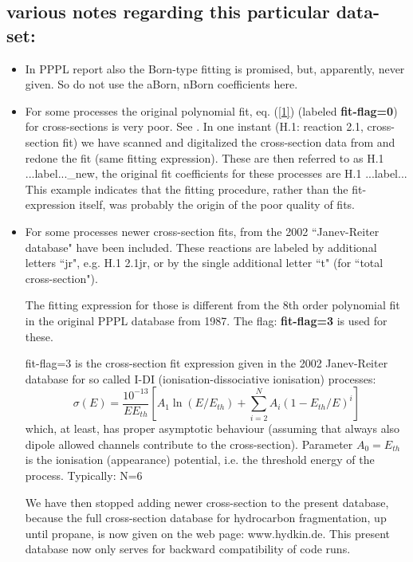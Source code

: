 \documentclass[12pt,dvipdfmx]{article}
\begin{document}
\subsection{various notes regarding this particular data-set:}
\begin{itemize}
\item
In PPPL report \cite{kn:Ehrhardt} also the Born-type fitting is
promised, but, apparently, never given. So do not use the  aBorn,
nBorn coefficients here.
\item
For some processes the original polynomial fit, eq. (\ref{1})
(labeled \textbf{fit-flag=0}) for cross-sections is very poor. See
\cite{kn:Dose}.
In one instant (H.1: reaction 2.1, cross-section fit) we have scanned and
digitalized the cross-section data from
\cite{kn:Ehrhardt} and redone the fit (same fitting expression).
These are then referred to as H.1 ...label...\mbox{\_new}, the original fit
coefficients for these processes are H.1 ...label...
This example indicates that the fitting procedure,
rather than the fit-expression itself, was probably the origin of the poor quality of fits.
\item
For some processes newer cross-section fits, from the 2002 ``Janev-Reiter database"
\cite{kn:JR-2002} have been included.
These reactions are labeled by additional letters ``jr",  e.g. H.1  2.1jr,
or by the single additional letter ``t" (for ``total cross-section").

The fitting expression for those is different from the 8th order polynomial fit
in the original PPPL database from 1987.
The flag: \textbf{fit-flag=3} is used for these.


fit-flag=3 is the cross-section fit expression given in the 2002 Janev-Reiter database \cite{kn:JR-2002} for so called I-DI (ionisation-dissociative ionisation) processes:
\begin{equation}\label{4}
\sigma(E)=\frac{10^{-13}}{E E_{th}}\left[A_1 \ln(E/E_{th}) + \sum_{i=2}^N A_i(1-E_{th}/E)^i \right]
\end{equation}
which, at least, has proper asymptotic behaviour (assuming that always also dipole allowed channels contribute to the cross-section).
Parameter $A_0 = E_{th}$ is the ionisation (appearance) potential, i.e. the threshold energy of the process. Typically: N=6

We have then stopped adding newer cross-section to the present database, because
the full cross-section database for hydrocarbon fragmentation, up until propane,
is now given on the web page: www.hydkin.de.  This present database now only serves for backward compatibility of code runs.


\end{itemize}
\end{document}

